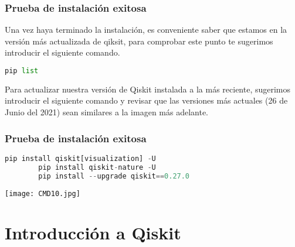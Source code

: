 \documentclass[spanish]{beamer}
\begin{document}
    

    \begin{frame}[fragile]
    \frametitle{Prueba de instalación exitosa} 
    
     Una vez haya terminado la instalación, es conveniente saber que estamos en la versión más actualizada de qiksit, para comprobar este punto te sugerimos introducir el siguiente comando.
     
       \begin{lstlisting}[language=Python]
        pip list\end{lstlisting}

      Para actualizar nuestra versión de Qiskit instalada a la más reciente, sugerimos introducir el siguiente comando y revisar que las versiones más actuales (26 de Junio del 2021) sean similares a la imagen más adelante.
      
    \end{frame} 

    \newpage
    \begin{frame}[fragile]
     \frametitle{Prueba de instalación exitosa} 
    \begin{lstlisting}[language=Python]
        pip install qiskit[visualization] -U
        pip install qiskit-nature -U
        pip install --upgrade qiskit==0.27.0 \end{lstlisting}
       
    \centering\texttt{[image: CMD10.jpg]}
    \end{frame} 
    
    
\newpage
\section{Introducción a Qiskit}
\setlength{\parskip}{5mm}
\justify
\end{document}

